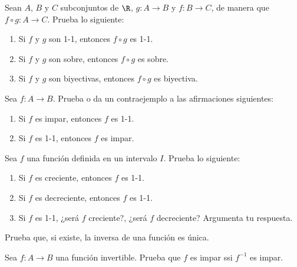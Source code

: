 \documentclass[12pt,a4paper]{book}
\begin{document}
    \begin{ejercicio}\label{ej:119}
        Sean $A$, $B$ y $C$ subconjuntos de $\R$, $g:A\to B$ y $f:B\to C$,
        de manera que $f\circ g:A\to C$. Prueba lo siguiente:
        \begin{enumerate}[nosep]
            \item Si $f$ y $g$ son 1-1, entonces $f\circ g$ es 1-1.
            \item Si $f$ y $g$ son sobre, entonces $f\circ g$ es sobre.
            \item Si $f$ y $g$ son biyectivas, entonces $f\circ g$ es biyectiva.
        \end{enumerate}
    \end{ejercicio}

    \begin{ejercicio}\label{ej:120}
        Sea $f:A\to B$. Prueba o da un contraejemplo a las
        afirmaciones siguientes:
        \begin{enumerate}[nosep]
            \item Si $f$ es impar, entonces $f$ es 1-1.
            \item Si $f$ es 1-1, entonces $f$ es impar.
        \end{enumerate}
    \end{ejercicio}

    \begin{ejercicio}\label{ej:121}
        Sea $f$ una función definida en un intervalo $I$. Prueba lo
        siguiente:
        \begin{enumerate}[nosep]
            \item Si $f$ es creciente, entonces $f$ es 1-1.
            \item Si $f$ es decreciente, entonces $f$ es 1-1.
            \item Si $f$ es 1-1, ¿será $f$ creciente?, ¿será $f$ decreciente? Argumenta tu respuesta.
        \end{enumerate}
    \end{ejercicio}

    \begin{ejercicio}\label{ej:122}
        Prueba que, si existe,
        la inversa de una función es única.
    \end{ejercicio}

    \begin{ejercicio}\label{ej:123}
        Sea $f:A\to B$ una función invertible. Prueba que $f$ es impar
        ssi $f^{-1}$ es impar.
    \end{ejercicio}
\end{document}
